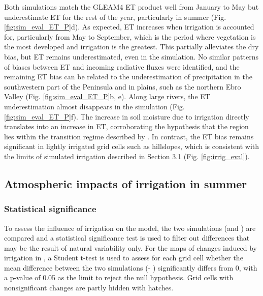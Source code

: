 Both simulations match the GLEAM4 ET product well from January to May but underestimate ET for the rest of the year, particularly in summer (Fig. \ref{fig:sim_eval_ET_P}d). As expected, ET increases when irrigation is accounted for, particularly from May to September, which is the period where vegetation is the most developed and irrigation is the greatest. This partially alleviates the dry bias, but ET remains underestimated, even in the \irr simulation.
No similar patterns of biases between ET and incoming radiative fluxes were identified, and the remaining ET bias can be related to the underestimation of precipitation in the southwestern part of the Peninsula and in plains, such as the northern Ebro Valley (Fig. \ref{fig:sim_eval_ET_P}b, e). 
Along large rivers, the ET underestimation almost disappears in the \irr simulation (Fig. \ref{fig:sim_eval_ET_P}f). The increase in soil moisture due to irrigation directly translates into an increase in ET, corroborating the hypothesis that the region lies within the transition regime described by \citet{Budyko_1956}. 
In contrast, the ET bias remains significant in lightly irrigated grid cells such as hillslopes, which is consistent with the limits of simulated irrigation described in Section 3.1 (Fig. \ref{fig:irrig_eval}).

\subsection{Atmospheric impacts of irrigation in summer}

\subsubsection{Statistical significance} %
To assess the influence of irrigation on the model, the two simulations (\irr and \noirr) are compared and a statistical significance test is used to filter out differences that may be the result of natural variability only. For the maps of changes induced by irrigation in %
, a Student t-test is used to assess for each grid cell whether the mean difference between the two simulations  (\irr - \noirr) significantly differs from 0, with a p-value of 0.05 as the limit to reject the null hypothesis. Grid cells with nonsignificant changes are partly hidden with hatches.

